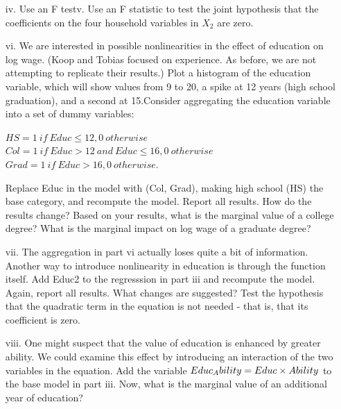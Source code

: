 \documentclass[a4paper]{ctexart}
\theoremstyle{remark}
\begin{document}
\begin{itemize}
\begin{enumerate}
        \item[iv.]Use an F testv. Use an F statistic to test the joint hypothesis that the coefficients on the four household variables in $X_{2}$ are zero.
        \item[vi.]We are interested in possible nonlinearities in the effect of education on log wage. (Koop and Tobias focused on experience. As before, we are not attempting to replicate their results.) Plot a histogram of the education variable, which will show values from 9 to 20, a spike at 12 years (high school graduation), and a second at 15.Consider aggregating the education variable into a set of dummy variables:
        \begin{center} 
            $HS=1\ if \ Educ \leq 12,0 \  otherwise$\\
            $Col=1  \ if \ Educ>12 \ and \ Educ \leq 16,0 \  otherwise$\\
            $Grad = 1 \  if \ Educ>16,0 \  otherwise.$
        \end{center}
            Replace Educ in the model with (Col, Grad), making high school (HS) the base category, and recompute the model. Report all results. How do the results change? Based on your results, what is the marginal value of a college degree? What is the marginal impact on log wage of a graduate degree?
        \item[vii.] The aggregation in part vi actually loses quite a bit of information. Another way to introduce nonlinearity in education is through the function itself. Add Educ2 to the regresssion in part iii and recompute the model. Again, report all results. What changes are suggested? Test the hypothesis that the quadratic term in the equation is not needed - that is, that its coefficient is zero.
        \item[viii.]One might suspect that the value of education is enhanced by greater ability. We could examine this effect by introducing an interaction of the two variables in the equation. Add the variable $\\ Educ_Ability = Educ \times Ability$ to the base model in part iii. Now, what is the marginal value of an additional year of education?
    \end{enumerate}


\end{itemize}
\end{document}
